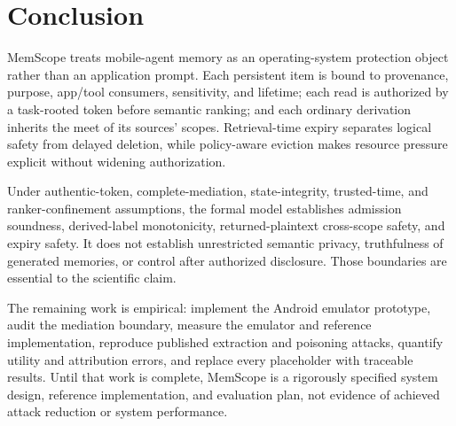 \section{Conclusion}
\label{sec:conclusion}

MemScope treats mobile-agent memory as an operating-system protection object rather than an application prompt. Each persistent item is bound to provenance, purpose, app/tool consumers, sensitivity, and lifetime; each read is authorized by a task-rooted token before semantic ranking; and each ordinary derivation inherits the meet of its sources' scopes. Retrieval-time expiry separates logical safety from delayed deletion, while policy-aware eviction makes resource pressure explicit without widening authorization.

Under authentic-token, complete-mediation, state-integrity, trusted-time, and ranker-confinement assumptions, the formal model establishes admission soundness, derived-label monotonicity, returned-plaintext cross-scope safety, and expiry safety. It does not establish unrestricted semantic privacy, truthfulness of generated memories, or control after authorized disclosure. Those boundaries are essential to the scientific claim.

The remaining work is empirical: implement the Android emulator prototype, audit the mediation boundary, measure the emulator and reference implementation, reproduce published extraction and poisoning attacks, quantify utility and attribution errors, and replace every placeholder with traceable results. Until that work is complete, MemScope is a rigorously specified system design, reference implementation, and evaluation plan, not evidence of achieved attack reduction or system performance.
